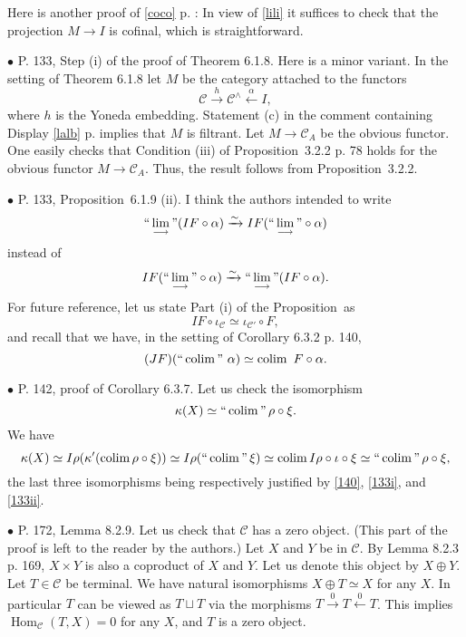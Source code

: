\documentclass[12pt]{article}
\newcommand{\bu}{\bullet}
\newcommand{\n}{\noindent}
\newcommand{\C}{\mathcal C}
\newcommand{\xl}{\xleftarrow}
\newcommand{\xr}{\xrightarrow}
\newcommand{\pr}{Proposition}
\newcommand{\colim}{\operatornamewithlimits{\underset{\longrightarrow}{lim}}}
\DeclareMathOperator*{\coli}{colim}
\DeclareMathOperator*{\co}{colim}
\DeclareMathOperator*{\ic}{``\coli"}
\DeclareMathOperator{\h}{Hom}
\begin{document}
Here is another proof of \eqref{coco} p. \pageref{coco}: In view of \eqref{lili} it suffices to check that the projection $M\to I$ is cofinal, which is straightforward. 
 

\n$\bu$ P. 133, Step (i) of the proof of Theorem 6.1.8. Here is a minor variant. In the setting of Theorem 6.1.8 let $M$ be the category attached to the functors 
$$
\C\xrightarrow h\C^\wedge\xleftarrow\alpha I,
$$ 
where $h$ is the Yoneda embedding. Statement (c) in the comment containing Display \eqref{lalb} p. \pageref{lalb} implies that $M$ is filtrant. Let $M\to\C_A$ be the obvious functor. One easily checks that Condition (iii) of \pr\ 3.2.2 p. 78 holds for the obvious functor $M\to\C_A$. Thus, the result follows from \pr\ 3.2.2. 


\n$\bu$ P. 133, \pr\ 6.1.9 (ii). I think the authors intended to write 
% 
\begin{equation}\label{133ii}
``\colim"(IF\circ\alpha)\xrightarrow\sim IF(``\colim"\circ\alpha)
\end{equation} 
% 
instead of 
$$
IF(``\colim"\circ\alpha)\xrightarrow\sim``\colim"(IF\circ\alpha). 
$$ 
For future reference, let us state Part (i) of the \pr\ as 
% 
\begin{equation}\label{133i}
IF\circ\iota_\C\simeq\iota_{\C'}\circ F, 
\end{equation} 
%
and recall that we have, in the setting of Corollary 6.3.2 p. 140, 
%
\begin{equation}\label{140}
(JF)(``\coli"\ \alpha)\simeq\coli\ F\circ\alpha.
\end{equation} 

\n$\bu$ P. 142, proof of Corollary 6.3.7. Let us check the isomorphism 
$$
\kappa(X)\simeq\ic\rho\circ\xi. 
$$ 
We have 
$$
\kappa(X)\simeq I\rho(\kappa'(\co\rho\circ\xi))\simeq I\rho(\ic\xi)\simeq\co I\rho\circ\iota\circ\xi\simeq\ic\rho\circ\xi, 
$$ 
the last three isomorphisms being respectively justified by \eqref{140}, \eqref{133i}, and \eqref{133ii}. 


\n$\bu$ P. 172, Lemma 8.2.9. Let us check that $\C$ has a zero object. (This part of the proof is left to the reader by the authors.) Let $X$ and $Y$ be in $\C$. By Lemma 8.2.3 p. 169, $X\times Y$ is also a coproduct of $X$ and $Y$. Let us denote this object by $X\oplus Y$. Let $T\in\C$ be terminal. We have natural isomorphisms $X\oplus T\simeq X$ for any $X$. In particular $T$ can be viewed as $T\sqcup T$ via the morphisms $T\xr0T\xl0T$. This implies $\h_\C(T,X)=0$ for any $X$, and $T$ is a zero object. 
\end{document}
